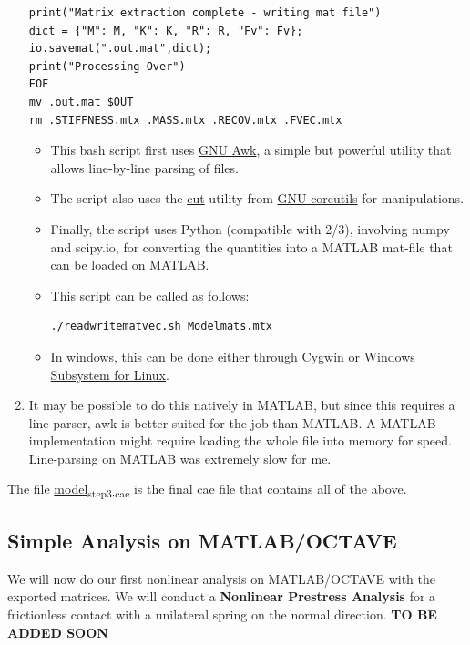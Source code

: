 \documentclass[11pt]{article}
\begin{document}
\begin{enumerate}
\begin{verbatim}
print("Matrix extraction complete - writing mat file")
dict = {"M": M, "K": K, "R": R, "Fv": Fv};
io.savemat(".out.mat",dict);
print("Processing Over")
EOF
mv .out.mat $OUT
rm .STIFFNESS.mtx .MASS.mtx .RECOV.mtx .FVEC.mtx
\end{verbatim}
\begin{itemize}
\item This bash script first uses \href{https://www.gnu.org/software/gawk/manual/gawk.html}{GNU Awk}, a simple but powerful utility that allows line-by-line parsing of files.
\item The script also uses the \href{https://www.gnu.org/software/coreutils/cut}{cut} utility from \href{https://www.gnu.org/software/coreutils/cut}{GNU coreutils} for manipulations.
\item Finally, the script uses Python (compatible with 2/3), involving numpy and scipy.io, for converting the quantities into a MATLAB mat-file that can be loaded on MATLAB.
\item This script can be called as follows:
\begin{verbatim}
./readwritematvec.sh Modelmats.mtx
\end{verbatim}
\item In windows, this can be done either through \href{https://www.cygwin.com/}{Cygwin} or \href{https://learn.microsoft.com/en-us/windows/wsl/install}{Windows Subsystem for Linux}.
\end{itemize}
\item It may be possible to do this natively in MATLAB, but since this requires a line-parser, awk is better suited for the job than MATLAB.
A MATLAB implementation might require loading the whole file into memory for speed.
Line-parsing on MATLAB was extremely slow for me.
\end{enumerate}
The file \href{https://github.com/Nidish96/Abaqus4Joints/blob/main/assets/assembly/model\_step3.cae}{model\textsubscript{step3.cae}} is the final cae file that contains all of the above.
\subsection{Simple Analysis on MATLAB/OCTAVE}
\label{sec:orgf396a47}
We will now do our first nonlinear analysis on MATLAB/OCTAVE with the exported matrices.
We will conduct a \textbf{Nonlinear Prestress Analysis} for a frictionless contact with a unilateral spring on the normal direction.
\textbf{TO BE ADDED SOON}
\end{document}
